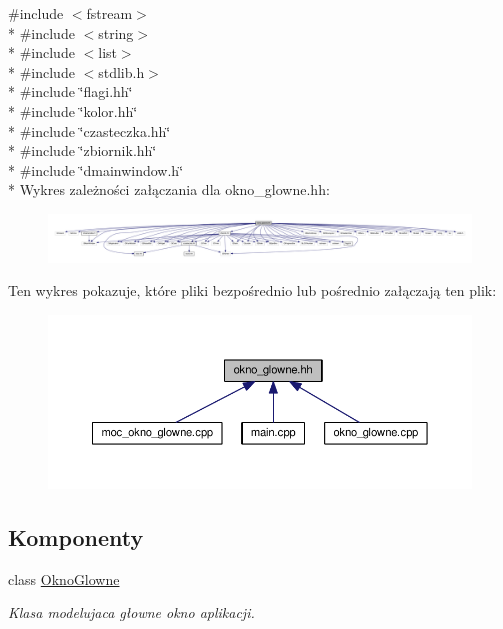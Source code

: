 {\ttfamily \#include $<$fstream$>$}\\*
{\ttfamily \#include $<$string$>$}\\*
{\ttfamily \#include $<$list$>$}\\*
{\ttfamily \#include $<$stdlib.\-h$>$}\\*
{\ttfamily \#include \char`\"{}flagi.\-hh\char`\"{}}\\*
{\ttfamily \#include \char`\"{}kolor.\-hh\char`\"{}}\\*
{\ttfamily \#include \char`\"{}czasteczka.\-hh\char`\"{}}\\*
{\ttfamily \#include \char`\"{}zbiornik.\-hh\char`\"{}}\\*
{\ttfamily \#include \char`\"{}dmainwindow.\-h\char`\"{}}\\*
Wykres zależności załączania dla okno\-\_\-glowne.\-hh\-:\nopagebreak
\begin{figure}[H]
\begin{center}
\leavevmode
\includegraphics[width=350pt]{okno__glowne_8hh__incl}
\end{center}
\end{figure}
Ten wykres pokazuje, które pliki bezpośrednio lub pośrednio załączają ten plik\-:\nopagebreak
\begin{figure}[H]
\begin{center}
\leavevmode
\includegraphics[width=350pt]{okno__glowne_8hh__dep__incl}
\end{center}
\end{figure}
\subsection*{Komponenty}
\begin{DoxyCompactItemize}
\item 
class \hyperlink{class_okno_glowne}{Okno\-Glowne}
\begin{DoxyCompactList}\small\item\em Klasa modelujaca głowne okno aplikacji. \end{DoxyCompactList}\end{DoxyCompactItemize}


